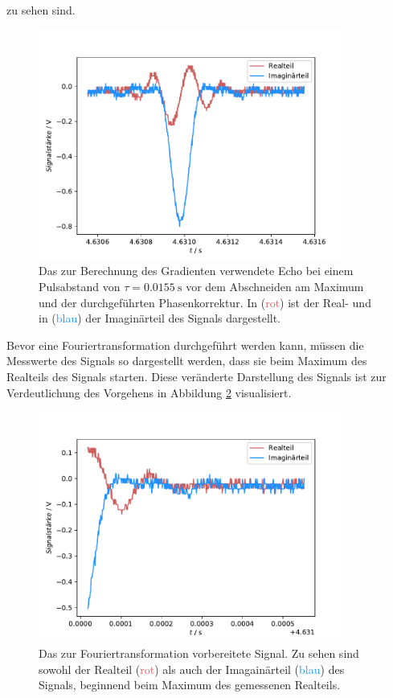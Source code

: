 zu sehen sind.
\begin{figure}[H]
  \centering
  \includegraphics[width=0.9\textwidth]{../Auswertung/echo_vorher.pdf}
  \caption{Das zur Berechnung des Gradienten verwendete Echo bei einem Pulsabstand von $\tau = \SI{0.0155}{\second}$ 
  vor dem Abschneiden am Maximum und der durchgeführten 
  Phasenkorrektur. In (\textcolor{indianred}{rot}) ist der Real- und in (\textcolor{dodgerblue}{blau}) der Imaginärteil des Signals dargestellt.}
  \label{fig:echo_vorher}
\end{figure} \noindent
Bevor eine Fouriertransformation durchgeführt werden kann, müssen die Messwerte des Signals so dargestellt werden, dass sie 
beim Maximum des Realteils des Signals starten. Diese veränderte Darstellung des Signals ist zur Verdeutlichung des Vorgehens in 
Abbildung \ref{fig:echo_ab} visualisiert.
\begin{figure}[H]
  \centering
  \includegraphics[width=0.9\textwidth]{../Auswertung/echo_abgeschnitten.pdf}
  \caption{Das zur Fouriertransformation vorbereitete Signal. Zu sehen sind sowohl der Realteil (\textcolor{indianred}{rot}) als auch der 
  Imagainärteil (\textcolor{dodgerblue}{blau}) des Signals, beginnend beim Maximum des gemessenen Realteils.}
  \label{fig:echo_ab}
\end{figure} \noindent
